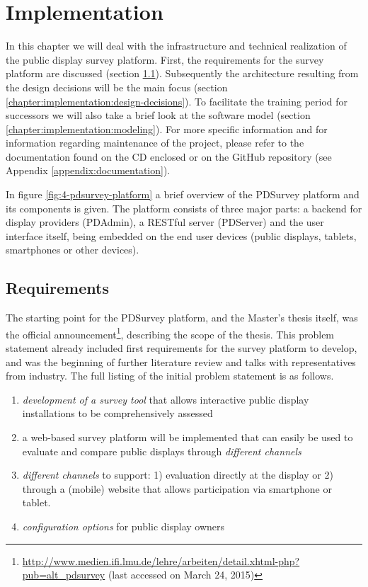\section{Implementation}
\label{chapter:implementation}

	In this chapter we will deal with the infrastructure and technical realization of the public display survey platform. First, the requirements for the survey platform are discussed (section \ref{chapter:implementation:requirements}). Subsequently the architecture resulting from the design decisions will be the main focus (section \ref{chapter:implementation:design-decisions}). To facilitate the training period for successors we will also take a brief look at the software model (section \ref{chapter:implementation:modeling}). For more specific information and for information regarding maintenance of the project, please refer to the documentation found on the CD enclosed or on the GitHub repository (see Appendix \ref{appendix:documentation}).

	In figure \ref{fig:4-pdsurvey-platform} a brief overview of the PDSurvey platform and its components is given. The platform consists of three major parts: a backend for display providers (PDAdmin), a RESTful server (PDServer) and the user interface itself, being embedded on the end user devices (public displays, tablets, smartphones or other devices). 





\subsection{Requirements}
\label{chapter:implementation:requirements}

	The starting point for the PDSurvey platform, and the Master's thesis itself, was the official announcement\footnote{\url{http://www.medien.ifi.lmu.de/lehre/arbeiten/detail.xhtml-php?pub=alt_pdsurvey} (last accessed on March 24, 2015)}, describing the scope of the thesis. This problem statement already included first requirements for the survey platform to develop, and was the beginning of further literature review and talks with representatives from industry. The full listing of the initial problem statement is as follows.

	\begin{enumerate}[itemsep=0pt] 
	\item \textit{development of a survey tool} that allows interactive public display installations to be comprehensively assessed 
	\item a web-based survey platform will be implemented that can easily be used to evaluate and compare public displays through \textit{different channels} 
	\item \textit{different channels} to support: 1) evaluation directly at
	the display or 2) through a (mobile) website that allows participation via smartphone or tablet.
	\item \textit{configuration options} for public display owners
	\end{enumerate}

